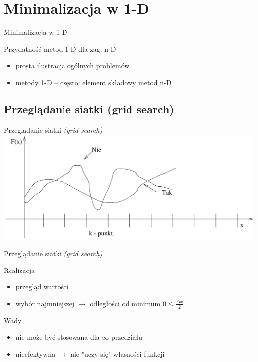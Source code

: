 \section{Minimalizacja w 1-D}
  \begin{frame}{Minimalizacja w 1-D}
    \begin{block}{Przydatność metod 1-D dla zag. n-D}
      \begin{itemize}
        \item prosta ilustracja ogólnych problemów
        \item metody 1-D -- często: element składowy metod n-D

      \end{itemize}

    \end{block}

  \end{frame}

\subsection{Przeglądanie siatki (grid search)}
  \begin{frame}{Przeglądanie siatki \emph{(grid search)}}
    \includegraphics[width=1\textwidth]{img/17/przegladanie_siatki}
  \end{frame}

  \begin{frame}{Przeglądanie siatki \emph{(grid search)}}
    \begin{block}{Realizacja}
      \begin{itemize}
        \item przegląd wartości
        \item wybór najmniejszej $ \to $ odległości od minimum
        $ 0 \leq \frac{\Delta x}{2} $
      \end{itemize}
    \end{block}
    \begin{block}{Wady}
      \begin{itemize}
        \item nie może być stosowana dla $ \infty $ przedziału
        \item nieefektywna $ \to $ nie "uczy się" własności funkcji %
      \end{itemize}
    \end{block}
  \end{frame}

